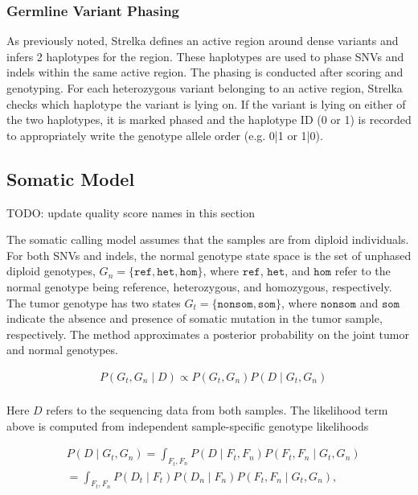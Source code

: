 \documentclass{article}
\begin{document}
\subsubsection{Germline Variant Phasing}
As previously noted, Strelka defines an active region around dense variants and infers 2 haplotypes for the region. These haplotypes are used to phase SNVs and indels within the same active region. The phasing is conducted after scoring and genotyping. For each heterozygous variant belonging to an active region, Strelka checks which haplotype the variant is lying on. If the variant is lying on either of the two haplotypes, it is marked phased and the haplotype ID (0 or 1) is recorded to appropriately write the genotype allele order (e.g. 0|1 or 1|0).


\subsection{Somatic Model}

TODO: update quality score names in this section

The somatic calling model assumes that the samples are from diploid individuals. For both SNVs and indels, the normal genotype state space is the set of unphased diploid genotypes, $G_n = \{ \texttt{ref}, \texttt{het}, \texttt{hom}\}$, where $\texttt{ref}$, $\texttt{het}$, and $\texttt{hom}$ refer to the normal genotype being reference, heterozygous, and homozygous, respectively. The tumor genotype has two states $G_t = \{ \texttt{nonsom}, \texttt{som} \}$, where $\texttt{nonsom}$ and $\texttt{som}$ indicate the absence and presence of somatic mutation in the tumor sample, respectively. The method approximates a posterior probability on the joint tumor and normal genotypes.

\begin{align*}
	& P(G_t,G_n \mid D) \propto P(G_t,G_n) P(D \mid G_t,G_n) \\
\end{align*}


Here $D$ refers to the sequencing data from both samples. The likelihood term above is computed from independent sample-specific genotype likelihoods

\begin{align*}
	& P(D \mid G_t,G_n) = \int_{F_t,F_n}{P(D \mid F_t,F_n)P(F_t,F_n \mid G_t,G_n)} \\
	& = \int_{F_t,F_n}{P(D_t \mid F_t)P(D_n \mid F_n)P(F_t,F_n \mid G_t,G_n)},
\end{align*}
\end{document}

